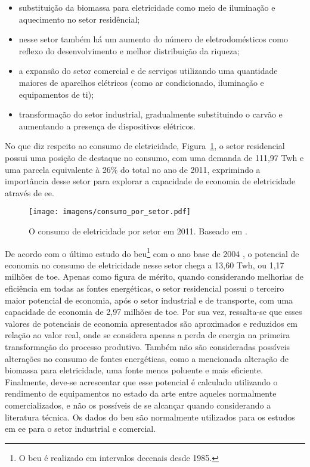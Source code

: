 \begin{itemize}
\item substituição da biomassa para eletricidade como meio de iluminação 
e aquecimento
no setor residêncial;
\item nesse setor também há um aumento do número de eletrodomésticos como
reflexo do desenvolvimento e melhor distribuição da riqueza;
\item a expansão do setor comercial e de serviços utilizando uma quantidade
maiores de aparelhos elétricos (como ar condicionado, iluminação e equipamentos
de \acrshort{ti}); 
\item transformação do setor industrial, gradualmente substituindo o carvão e 
aumentando a presença de dispositivos elétricos.
\end{itemize}

No que diz respeito ao consumo de eletricidade, 
Figura~\ref{fig:eletricidade_por_setor}, 
o setor residencial possui uma posição de destaque no consumo, com uma demanda
de 111,97 T\acrshort{wh} e uma parcela equivalente à 26\% do total no ano de 2011, 
exprimindo a importância desse setor para explorar a capacidade de economia de 
eletricidade através de \gls{ee}. 

\begin{figure}[h!t]
\centering
\texttt{[image: imagens/consumo\_por\_setor.pdf]}
\caption[Consumo de eletricidade por setor em 2011.]
{O consumo de eletricidade por setor em 2011. Baseado em \cite{ben2012}.}
\label{fig:eletricidade_por_setor}
\end{figure}

De acordo com o último estudo do \gls{beu}\footnote{O \gls{beu} é
realizado em intervalos decenais desde 1985.} com o ano base de 2004
\cite{beu}, o potencial de economia no consumo de eletricidade nesse
setor chega a 13,60 T\acrshort{wh}, ou 1,17 milhões de \acrshort{toe}.
Apenas como figura de mérito, quando considerando melhorias de
eficiência em todas as fontes energéticas, o setor residencial possui
o terceiro maior potencial de economia, após o setor industrial e de
transporte, com uma capacidade de economia de 2,97 milhões de
\acrshort{toe}. Por sua vez, ressalta-se que esses valores de
potenciais de economia apresentados são aproximados e reduzidos em
relação ao valor real, onde se considera apenas a perda de energia na
primeira transformação do processo produtivo. Também não são
consideradas possíveis alterações no consumo de fontes energéticas,
como a mencionada alteração de biomassa para eletricidade, uma fonte
menos poluente e mais eficiente. Finalmente, deve-se acrescentar que
esse potencial é calculado utilizando o rendimento de equipamentos no
estado da arte entre aqueles normalmente comercializados, e não os
possíveis de se alcançar quando considerando a literatura técnica. Os
dados  do \gls{beu} são normalmente utilizados para os estudos em
\gls{ee} para o setor industrial e comercial.

